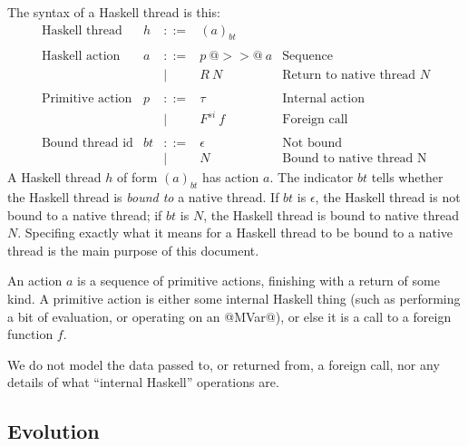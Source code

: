\documentclass{article}
\newcommand{\fcall}[2]{F^{#1}~#2}
\newcommand{\ret}[1]{R~#1}
\begin{document}
The syntax of a Haskell thread is this:
$$
\begin{array}{lrcll}
\mbox{Haskell thread} &  h & ::= & (a)_{bt} \\
\\
\mbox{Haskell action} &  a & ::= & p ~@>>@~ a  & \mbox{Sequence} \\
        & & | & \ret{N}  & \mbox{Return to native thread $N$} \\
\\
\mbox{Primitive action} &  p & ::= & \tau & \mbox{Internal action} \\
        & & | & \fcall{si}{f} & \mbox{Foreign call} \\
\\
\mbox{Bound thread id} & bt & ::= & \epsilon & \mbox{Not bound} \\
        & & | & N & \mbox{Bound to native thread N}
\end{array}
$$
A Haskell thread $h$ of form $(a)_{bt}$ has action $a$.  The indicator
$bt$ tells whether the Haskell thread is \emph{bound to} a native
thread.  If $bt$ is $\epsilon$, the Haskell thread is not bound to a
native thread; if $bt$ is $N$, the Haskell thread is bound to native
thread $N$.  Specifing exactly what it means for a Haskell thread to
be bound to a native thread is the main purpose of this document.

An action $a$ is a sequence of primitive actions, finishing with a 
return of some kind.  A primitive action is either some internal Haskell
thing (such as performing a bit of evaluation, or operating on an @MVar@),
or else it is a call to a foreign function $f$.

We do not model the data passed to, or returned from, a foreign call, nor
any details of what ``internal Haskell'' operations are.  

\subsection{Evolution}
\end{document}
